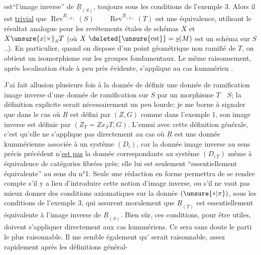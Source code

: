 
est``l'image inverse'' de $\underline{R}_{(S)}$, toujours sous les conditions de l'exemple 3. Alors il est \uline{trivial} que $\operatorname{Rev}^{\underline{R}_{(S)}}(S)\qquad\operatorname{Rev}^{\underline{R}_{(T)}}(T)$ est une équivalence, utilisant le résultat analogue pour les revêtements étales de schémas $X$ et $X\unsure{x|\times}_{S}T$ (où $X\ \deleted{\unsure{\mathrm{est}}}=\underline{s}(M)$ est un schéma  sur $S$ ..). En particulier, quand on dispose d'un point géométrique non ramifié de $T$, on obtient un isomorphisme sur les groupes fondamentaux. Le même raisonnement, après localisation étale à peu près évidente, s'applique au cas kummérien .

J'ai fait allusion plusieurs fois à la donnée de définir une donnée de ramification image inverse d'une donnée de ramification sur $S$ par un morphisme $T\quad S$; la définition explicite serait nécessairement un peu lourde; je me borne à signaler que dans le cas où $\underline{R}$ est défini par $(Z,G)$ comme dans l'exemple 1, son image inverse est définie par $(Z_T=Zx_ST,G)$. L'ennui avec cette définition générale, c'est qu'elle ne s'applique pas directement au cas où $\underline{R}$ est une donnée kummérienne associée à un systême $(D_i)$, car la donnée image inverse au sens précis précédent n'\uline{est pas} la donnée correspondante au systême $(D_{i\,T})$ même à équivalence de catégories fibrées près; elle lui est seulement ``essentiellement équivalente'' au sens du n°1. Seule une rédaction en forme permettra de se rendre compte s'il y a lieu d'introduire cette notion d'image inverse, ou s'il ne vaut pas mieux donner des conditions axiomatiques sur la donnée $(\unsure{*|\pi})$, sous les conditions de l'exemple 3, qui assurent moralement que $\underline{R}_{(T)}$ est essentiellement équivalente à l'image inverse de $\underline{R}_{(S)}$. Bien sûr, ces conditions, pour  être utiles, doivent s'appliquer directement aux cas kummériens. Ce sera sans doute le parti le plus raisonnable. Il me semble également qu' serait raisonnable, assez rapidement après les définitions général-
